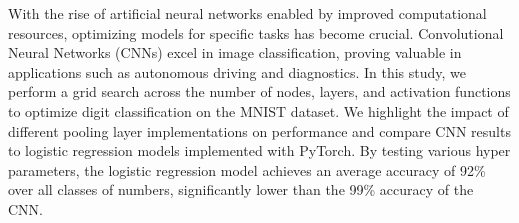 With the rise of artificial neural networks enabled by improved computational resources, optimizing models for specific tasks has become crucial. Convolutional Neural Networks (CNNs) excel in image classification, proving valuable in applications such as autonomous driving and diagnostics. In this study, we perform a grid search across the number of nodes, layers, and activation functions to optimize digit classification on the MNIST dataset. We highlight the impact of different pooling layer implementations on performance and compare CNN results to logistic regression models implemented with PyTorch. By testing various hyper parameters, the logistic regression model achieves an average accuracy of 92\% over all classes of numbers, significantly lower than the 99\% accuracy of the CNN.